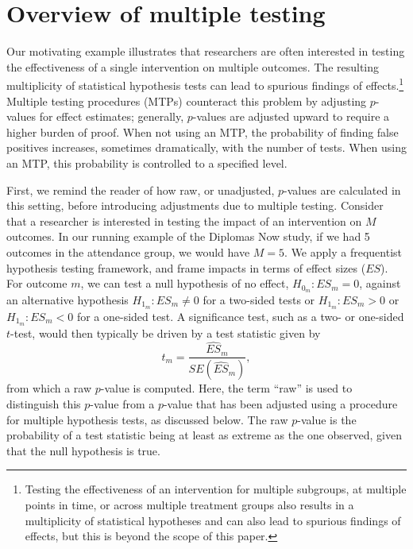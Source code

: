 \documentclass[
]{article}
\begin{document}
\section{Overview of multiple testing}
\label{sec:mtp_overview}

Our motivating example illustrates that researchers are often interested
in testing the effectiveness of a single intervention on multiple
outcomes. The resulting multiplicity of statistical hypothesis tests can
lead to spurious findings of
effects.\footnote{Testing the effectiveness of an intervention for multiple subgroups, at multiple points in time, or across multiple treatment groups also results in a multiplicity of statistical hypotheses and can also lead to spurious findings of effects, but this is beyond the scope of this paper.}
Multiple testing procedures (MTPs) counteract this problem by adjusting
\(p\)-values for effect estimates; generally, \(p\)-values are adjusted
upward to require a higher burden of proof. When not using an MTP, the
probability of finding false positives increases, sometimes
dramatically, with the number of tests. When using an MTP, this
probability is controlled to a specified level.

First, we remind the reader of how raw, or unadjusted, \(p\)-values are
calculated in this setting, before introducing adjustments due to
multiple testing. Consider that a researcher is interested in testing
the impact of an intervention on \(M\) outcomes. In our running example
of the Diplomas Now study, if we had 5 outcomes in the attendance group,
we would have \(M = 5\). We apply a frequentist hypothesis testing
framework, and frame impacts in terms of effect sizes (\(ES\)). For
outcome \(m\), we can test a null hypothesis of no effect,
\(H_{0_m}: ES_m = 0\), against an alternative hypothesis
\(H_{1_m}: ES_m \neq 0\) for a two-sided tests or \(H_{1_m}: ES_m > 0\)
or \(H_{1_m}: ES_m < 0\) for a one-sided test. A significance test, such
as a two- or one-sided \(t\)-test, would then typically be driven by a
test statistic given by \begin{equation}
t_m = \frac{\hat{ES}_m}{SE(\hat{ES}_m)},
\end{equation} from which a raw \(p\)-value is computed. Here, the term
``raw'' is used to distinguish this \(p\)-value from a \(p\)-value that
has been adjusted using a procedure for multiple hypothesis tests, as
discussed below. The raw \(p\)-value is the probability of a test
statistic being at least as extreme as the one observed, given that the
null hypothesis is true.
\end{document}
